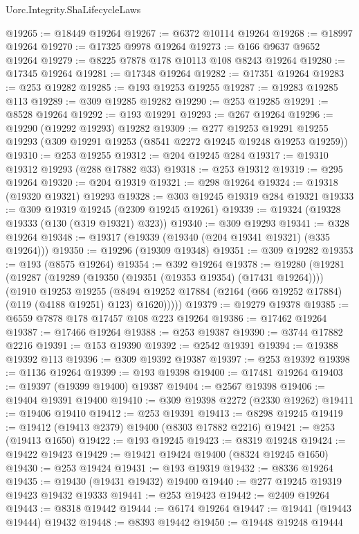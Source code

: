 \begin{lexlean}{Uorc.Integrity.ShaLifecycleLaws}
\begin{coremodule}
@19265 := @18449 @19264
@19267 := @6372 @10114 @19264
@19268 := @18997 @19264
@19270 := @17325 @9978 @19264
@19273 := @166 @9637 @9652 @19264
@19279 := @8225 @7878 @178 @10113 @108 @8243 @19264
@19280 := @17345 @19264
@19281 := @17348 @19264
@19282 := @17351 @19264
@19283 := @253 @19282
@19285 := @193 @19253 @19255
@19287 := @19283 @19285 @113
@19289 := @309 @19285 @19282
@19290 := @253 @19285
@19291 := @8528 @19264
@19292 := @193 @19291
@19293 := @267 @19264
@19296 := @19290 (@19292 @19293) @19282
@19309 := @277
    @19253
    @19291
    @19255
    @19293
    (@309 @19291 @19253 (@8541 @2272 @19245 @19248 @19253 @19259))
@19310 := @253 @19255
@19312 := @204 @19245 @284
@19317 := @19310 @19312 @19293 (@288 @17882 @33)
@19318 := @253 @19312
@19319 := @295 @19264
@19320 := @204 @19319
@19321 := @298 @19264
@19324 := @19318 (@19320 @19321) @19293
@19328 := @303 @19245 @19319 @284 @19321
@19333 := @309 @19319 @19245 (@2309 @19245 @19261)
@19339 := @19324 (@19328 @19333 (@130 (@319 @19321) @323))
@19340 := @309 @19293
@19341 := @328 @19264
@19348 := @19317 (@19339 (@19340 (@204 @19341 @19321) (@335 @19264)))
@19350 := @19296 (@19309 @19348)
@19351 := @309 @19282
@19353 := @193 (@8575 @19264)
@19354 := @392 @19264
@19378 := @19280
    (@19281
      (@19287
        (@19289 (@19350 (@19351 (@19353 @19354) (@17431 @19264))))
        (@1910
          @19253
          @19255
          (@8494 @19252 @17884 (@2164 (@66 @19252 @17884) (@119 (@4188 @19251) @123) @1620)))))
@19379 := @19279 @19378
@19385 := @6559 @7878 @178 @17457 @108 @223 @19264
@19386 := @17462 @19264
@19387 := @17466 @19264
@19388 := @253 @19387
@19390 := @3744 @17882 @2216
@19391 := @153 @19390
@19392 := @2542 @19391
@19394 := @19388 @19392 @113
@19396 := @309 @19392 @19387
@19397 := @253 @19392
@19398 := @1136 @19264
@19399 := @193 @19398
@19400 := @17481 @19264
@19403 := @19397 (@19399 @19400) @19387
@19404 := @2567 @19398
@19406 := @19404 @19391 @19400
@19410 := @309 @19398 @2272 (@2330 @19262)
@19411 := @19406 @19410
@19412 := @253 @19391
@19413 := @8298 @19245
@19419 := @19412 (@19413 @2379) @19400 (@8303 @17882 @2216)
@19421 := @253 (@19413 @1650)
@19422 := @193 @19245
@19423 := @8319 @19248
@19424 := @19422 @19423
@19429 := @19421 @19424 @19400 (@8324 @19245 @1650)
@19430 := @253 @19424
@19431 := @193 @19319
@19432 := @8336 @19264
@19435 := @19430 (@19431 @19432) @19400
@19440 := @277 @19245 @19319 @19423 @19432 @19333
@19441 := @253 @19423
@19442 := @2409 @19264
@19443 := @8318 @19442
@19444 := @6174 @19264
@19447 := @19441 (@19443 @19444) @19432
@19448 := @8393 @19442
@19450 := @19448 @19248 @19444

\end{coremodule}
\end{lexlean}
